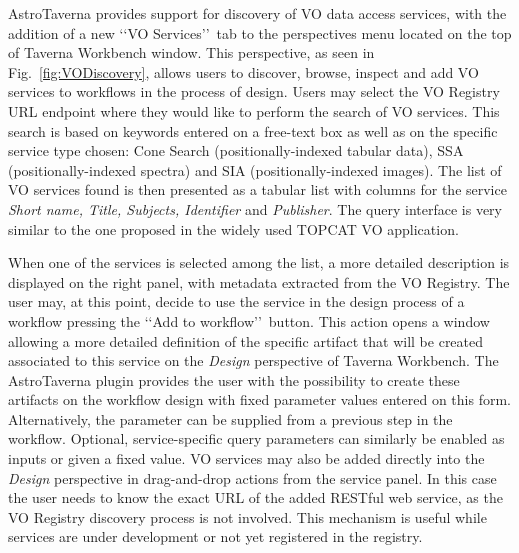 \documentclass{aa}
\begin{document}
AstroTaverna provides support for discovery of VO data access services, with the addition of a new \lq\lq VO Services\rq\rq\ tab to the perspectives menu located on the top of Taverna Workbench window. This perspective, as seen in Fig.~\ref{fig:VODiscovery}, allows users to discover, browse, inspect and add VO services to workflows in the process of design. Users may select the VO Registry URL endpoint where they would like to perform the search of VO services. This search is based on keywords entered on a free-text box as well as on the specific service type chosen: Cone Search (positionally-indexed tabular data), SSA (positionally-indexed spectra) and SIA (positionally-indexed images). The list of VO services found is then presented as a tabular list with columns for the service \textit{Short name, Title, Subjects, Identifier} and \textit{Publisher}. The query interface is very similar to the one proposed in the widely used TOPCAT VO application. 

When one of the services is selected among the list, a more detailed description is displayed on the right panel, with metadata extracted from the VO Registry. The user may, at this point, decide to use the service in the design process of a workflow pressing the \lq\lq Add to workflow\rq\rq\ button. This action opens a window allowing a more detailed definition of the specific artifact that will be created associated to this service on the \emph{Design} perspective of Taverna Workbench. The AstroTaverna plugin provides the user with the possibility to create these artifacts on the workflow design with fixed parameter values entered on this form. Alternatively, the parameter can be supplied from a previous step in the workflow. Optional, service-specific query parameters can similarly be enabled as inputs or given a fixed value. VO services may also be added directly into the \emph{Design} perspective in drag-and-drop actions from the service panel. In this case the user needs to know the exact URL of the added RESTful web service, as the VO Registry discovery process is not involved. This mechanism is useful while services are under development or not yet registered in the registry.
\end{document}
